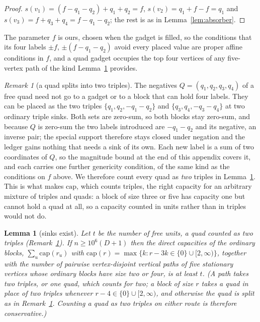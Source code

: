 \documentclass[11pt,a4paper]{article}
\theoremstyle{plain}
\newtheorem{lemma}[theorem]{Lemma}
\theoremstyle{definition}
\theoremstyle{remark}
\newtheorem{remark}[theorem]{Remark}
\begin{document}
\begin{proof}
$s(v_1)=(f-q_1-q_2)+q_1+q_2=f$, $s(v_2)=q_1+f-f=q_1$ and
$s(v_3)=f+q_3+q_4=f-q_1-q_2$; the rest is as in Lemma~\ref{lem:absorber}.
\end{proof}

The parameter $f$ is ours, chosen when the gadget is filled, so the
conditions that its four labels $\pm f$, $\pm(f-q_1-q_2)$ avoid every placed
value are proper affine conditions in $f$, and a quad gadget occupies the top
four vertices of any five-vertex path of the kind Lemma~\ref{lem:packing}
provides.

\begin{remark}[a quad splits into two triples]\label{rem:quadsplit}
The negatives $Q=(q_1,q_2,q_3,q_4)$ of a free quad need not go to a gadget or
to a block that can hold four labels.  They can be placed as the two triples
$\{q_1,q_2,-q_1-q_2\}$ and $\{q_3,q_4,-q_3-q_4\}$ at two ordinary triple
sinks.  Both sets are zero-sum, so both blocks stay zero-sum, and because $Q$
is zero-sum the two labels introduced are $-q_1-q_2$ and its negative, an
inverse pair; the special support therefore stays closed under negation and
the ledger gains nothing that needs a sink of its own.  Each new label is a
sum of two coordinates of $Q$, so the magnitude bound at the end of this
appendix covers it, and each carries one further genericity condition, of the
same kind as the conditions on $f$ above.  We therefore count every quad as
\emph{two} triples in Lemma~\ref{lem:packing}.  This is what makes
$\mathrm{cap}$, which counts triples, the right capacity for an arbitrary
mixture of triples and quads: a block of size three or five has capacity one
but cannot hold a quad at all, so a capacity counted in units rather than in
triples would not do.
\end{remark}

\begin{lemma}[sinks exist]\label{lem:packing}
Let $t$ be the number of free units, a quad counted as two triples
(Remark~\ref{rem:quadsplit}).  If $n\ge 10^6(D+1)$ then the
direct capacities of the ordinary blocks, $\sum_u\mathrm{cap}(r_u)$ with
$\mathrm{cap}(r)=\max\{k: r-3k\in\{0\}\cup[2,\infty)\}$, together with the
number of pairwise vertex-disjoint vertical paths of five stationary vertices
whose ordinary blocks have size two or four, is at least $t$.  (A path takes two triples, or one quad, which counts
for two; a block of size $r$ takes a quad in place of two triples whenever
$r-4\in\{0\}\cup[2,\infty)$, and otherwise the quad is split as in
Remark~\ref{rem:quadsplit}.  Counting a quad as two triples on either route
is therefore conservative.)
\end{lemma}
\end{document}
